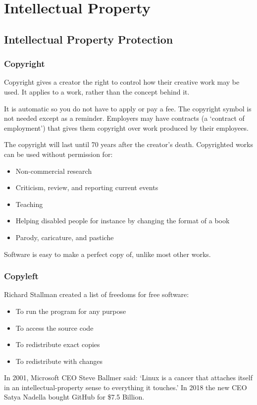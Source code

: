 \chapter{Intellectual Property}

\section{Intellectual Property Protection}
\subsection{Copyright}
Copyright gives a creator the right to control how their creative work may be used. It applies to a work, rather than the concept behind it.

It is automatic so you do not have to apply or pay a fee. The copyright symbol is not needed except as a reminder. Employers may have contracts (a `contract of employment') that gives them copyright over work produced by their employees.

The copyright will last until 70 years after the creator's death. Copyrighted works can be used without permission for:
\begin{itemize}
    \item Non-commercial research
    \item Criticism, review, and reporting current events
    \item Teaching
    \item Helping disabled people for instance by changing the format of a book
    \item Parody, caricature, and pastiche
\end{itemize}
Software is easy to make a perfect copy of, unlike most other works.

\subsection{Copyleft}
Richard Stallman created a list of freedoms for free software:
\begin{itemize}
    \item To run the program for any purpose
    \item To access the source code
    \item To redistribute exact copies
    \item To redistribute with changes
\end{itemize}
In 2001, Microsoft CEO Steve Ballmer said: `Linux is a cancer that attaches itself in an intellectual-property sense to everything it touches.' In 2018 the new CEO Satya Nadella bought GitHub for \$7.5 Billion.


